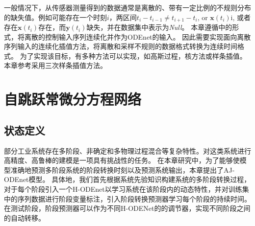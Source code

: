 一般情况下，从传感器测量得到的数据通常是离散的、带有一定比例的不规则分布的缺失值。例如可能存在一个时刻$i$，两区间$t_i-t_{i-1} \neq t_{i+1}-t_{i}$, or $\boldsymbol x(t_i)$i, 或者存在$\boldsymbol x(t_i)$存在，而$\boldsymbol y(t_i)$缺失，并在数据集中表示为\textit{Null}。
本章遵循\cite{zhong2019symplectic,kidger2020neural}中的形式，将离散的控制输入序列连续化并作为ODEnet的输入。
因此需要实现面向离散序列输入的连续化插值方法，将离散和采样不规则的数据格式转换为连续时间格式。
为了实现该目标，有多种方法可以实现，如高斯过程\cite{li2016scalable}，核方法\cite{shukla2018interpolation}或样条插值\cite{kidger2020neural}。本章参考\cite{kidger2020neural}采用三次样条插值方法。



\section{自跳跃常微分方程网络}
\label{sec:dfa-odenet}
\subsection{状态定义}
部分工业系统存在多阶段、非确定和多物理过程混合等复杂特性。对这类系统进行高精度、高鲁棒的建模是一项具有挑战性的任务。
在本章研究中，为了能够使模型准确地预测多阶段系统的阶段转换时刻以及预测系统输出，本章提出了AJ-ODEnet模型。
具体地，我们首先根据系统先验知识构建系统的多阶段转换过程，对于每个阶段引入一个H-ODEnet以学习系统在该阶段内的动态特性，并对训练集中的序列数据进行阶段变量标注，引入阶段转换预测器学习每个阶段的持续时间。
在测试阶段，阶段预测器可以作为不同H-ODENet的的调节器，实现不同阶段之间的自动转移。

